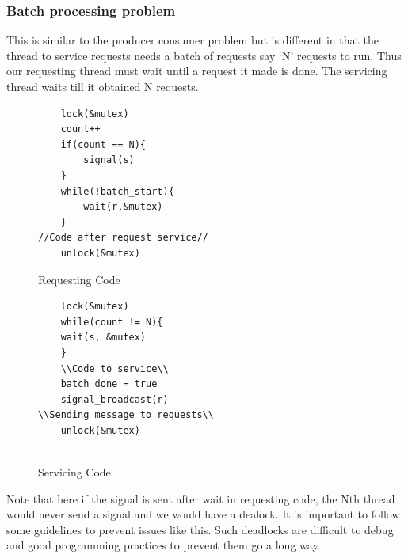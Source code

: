 \documentclass[12pt]{article}
\begin{document}
\subsubsection{Batch processing problem}
This is similar to the producer consumer problem but is different in that the thread to service requests needs a batch of requests say `N' requests to run. 
Thus our requesting thread must wait until a request it made is done. The servicing thread waits till it obtained N requests. 


\begin{figure}[H]
    \begin{minipage}{.5\textwidth}
    \begin{tcolorbox}[colback=red!5!white,colframe=red!75!black]
    \begin{verbatim}
    lock(&mutex)
    count++
    if(count == N){
        signal(s)
    }
    while(!batch_start){
        wait(r,&mutex)
    }
//Code after request service//
    unlock(&mutex)
    \end{verbatim}
    \end{tcolorbox}
    \caption{Requesting Code}
    \end{minipage}
    \hspace{0.05\textwidth}
    \begin{minipage}{.5\textwidth}
    \begin{tcolorbox}[colback=blue!5!white,colframe=blue!75!black]
    \begin{verbatim}
    lock(&mutex)
    while(count != N){
    wait(s, &mutex)
    }
    \\Code to service\\
    batch_done = true
    signal_broadcast(r)
\\Sending message to requests\\
    unlock(&mutex)
    
    \end{verbatim}
    \end{tcolorbox}
    \caption{Servicing Code}
    \end{minipage}
    \end{figure}
   
Note that here if the signal is sent after wait in requesting code, the Nth thread would never send a signal 
and we would have a dealock. It is important to follow some guidelines to prevent issues like this. Such deadlocks are difficult to debug and 
good programming practices to prevent them go a long way. 
\vspace{0.5cm}
\end{document}
